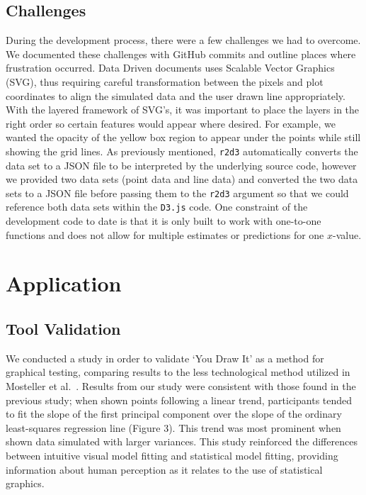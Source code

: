 \documentclass[10pt]{article}
\begin{document}
\subsection{Challenges}

During the development process, there were a few challenges we had to
overcome. We documented these challenges with GitHub commits and outline
places where frustration occurred. Data Driven documents uses Scalable
Vector Graphics (SVG), thus requiring careful transformation between the
pixels and plot coordinates to align the simulated data and the user
drawn line appropriately. With the layered framework of SVG's, it was
important to place the layers in the right order so certain features
would appear where desired. For example, we wanted the opacity of the
yellow box region to appear under the points while still showing the
grid lines. As previously mentioned, \texttt{r2d3} automatically
converts the data set to a JSON file to be interpreted by the underlying
source code, however we provided two data sets (point data and line
data) and converted the two data sets to a JSON file before passing them
to the \texttt{r2d3} argument so that we could reference both data sets
within the \texttt{D3.js} code. One constraint of the development code
to date is that it is only built to work with one-to-one functions and
does not allow for multiple estimates or predictions for one
\(x\)-value.

\section{Application}

\subsection{Tool Validation}

We conducted a study in order to validate `You Draw It' as a method for
graphical testing, comparing results to the less technological method
utilized in Mosteller et al.~. Results from
our study were consistent with those found in the previous study; when
shown points following a linear trend, participants tended to fit the
slope of the first principal component over the slope of the ordinary
least-squares regression line (Figure 3). This trend was most prominent
when shown data simulated with larger variances. This study reinforced
the differences between intuitive visual model fitting and statistical
model fitting, providing information about human perception as it
relates to the use of statistical graphics.
\end{document}

